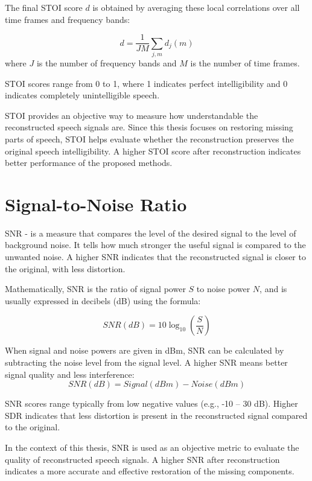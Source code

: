 The final STOI score \(d\) is obtained by averaging these local correlations over all time frames and frequency bands:


\[d = \frac{1}{JM}\sum_{j,m}d_j(m)\]
where \(J\) is the number of frequency bands and \(M\) is the number of time frames.

STOI scores range from 0 to 1, where 1 indicates perfect intelligibility and 0 indicates completely unintelligible speech. \cite{stoi}

STOI provides an objective way to measure how understandable the reconstructed speech signals are. Since this thesis focuses on restoring missing parts of speech, STOI helps evaluate whether the reconstruction preserves the original speech intelligibility. A higher STOI score after reconstruction indicates better performance of the proposed methods.



\section{Signal-to-Noise Ratio}

SNR - is a measure that compares the level of the desired signal to the level of background noise. It tells how much stronger the useful signal is compared to the unwanted noise. A higher SNR indicates that the reconstructed signal is closer to the original, with less distortion.

Mathematically, SNR is the ratio of signal power \(S\) to noise power \(N\), and is usually expressed in decibels (dB) using the formula:

\[SNR(dB) = 10\log_{10}{(\frac{S}{N})}\]

When signal and noise powers are given in dBm, SNR can be calculated by subtracting the noise level from the signal level. A higher SNR means better signal quality and less interference:
\[SNR(dB) = Signal(dBm) - Noise(dBm)\]

SNR scores range typically from low negative values (e.g., -10 – 30 dB). Higher SDR indicates that less distortion is present in the reconstructed signal compared to the original. \cite{snr}

In the context of this thesis, SNR is used as an objective metric to evaluate the quality of reconstructed speech signals. A higher SNR after reconstruction indicates a more accurate and effective restoration of the missing components.